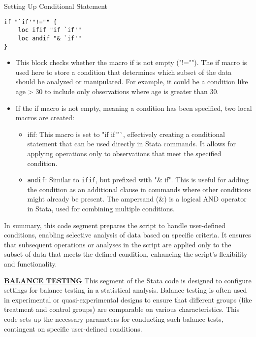 \documentclass{article}
\begin{document}
Setting Up Conditional Statement

\begin{mdframed}
\begin{verbatim}
if "`if'"!="" {
    loc ifif "if `if'"
    loc andif "& `if'"
}
\end{verbatim}
\end{mdframed}

\begin{itemize}
    \item This block checks whether the macro if is not empty ("!=""). The if macro is used here to store a condition that determines which subset of the data should be analyzed or manipulated. For example, it could be a condition like age > 30 to include only observations where age is greater than 30.
    \item If the if macro is not empty, meaning a condition has been specified, two local macros are created:
    \begin{itemize}
        \item	ifif: This macro is set to "if if'"`, effectively creating a conditional statement that can be used directly in Stata commands. It allows for applying operations only to observations that meet the specified condition.
    \item \texttt{andif}: Similar to \texttt{ifif}, but prefixed with "\& if". This is useful for adding the condition as an additional clause in commands where other conditions might already be present. The ampersand (\&) is a logical AND operator in Stata, used for combining multiple conditions.

    \end{itemize}
\end{itemize}

In summary, this code segment prepares the script to handle user-defined conditions, enabling selective analysis of data based on specific criteria. It ensures that subsequent operations or analyses in the script are applied only to the subset of data that meets the defined condition, enhancing the script's flexibility and functionality.



\underline{\textbf{BALANCE TESTING}}
\vspace{0.3cm}This segment of the Stata code is designed to configure settings for balance testing in a statistical analysis. Balance testing is often used in experimental or quasi-experimental designs to ensure that different groups (like treatment and control groups) are comparable on various characteristics. This code sets up the necessary parameters for conducting such balance tests, contingent on specific user-defined conditions.\newline
\end{document}
